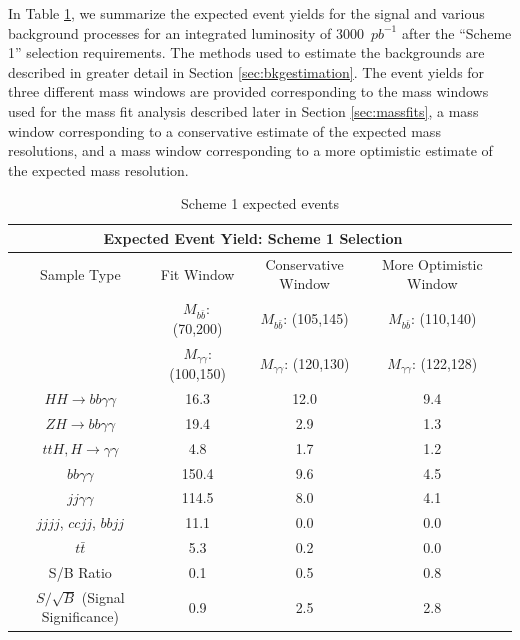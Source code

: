 \documentclass{cmspaper}
\begin{document}
In Table \ref{tab:scheme1_events}, we summarize the expected event yields for the signal and 
various background processes for an integrated luminosity of $3000$~$pb^{-1}$ after 
the ``Scheme 1'' selection requirements. The methods used to estimate the backgrounds
are described in greater detail in Section \ref{sec:bkgestimation}. The event yields
for three different mass windows are provided corresponding to the mass windows
used for the mass fit analysis described later in Section \ref{sec:massfits}, a mass window
corresponding to a conservative estimate of the expected mass resolutions, 
and a mass window corresponding to a more optimistic estimate of the expected mass resolution.
\begin{table}[!ht]
\begin{center}
\begin{tabular}{|c|c|c|c|c|}
\hline
\multicolumn{4}{|c|}{\textbf{Expected Event Yield: Scheme 1 Selection}}                                 \\ \hline
Sample Type & Fit Window                    & Conservative Window           & More Optimistic Window    \\ 
            & $M_{b\bar{b}}:$ (70,200)      & $M_{b\bar{b}}$: (105,145)     & $M_{b\bar{b}}$: (110,140)      \\ 
            & $M_{\gamma\gamma}$: (100,150) & $M_{\gamma\gamma}$: (120,130) & $M_{\gamma\gamma}$: (122,128)  \\ 
\hline
$HH\rightarrow bb\gamma\gamma$     & 16.3     & 12.0     & 9.4       \\ \hline
$ZH\rightarrow bb \gamma\gamma$    & 19.4     & 2.9      & 1.3       \\ 
$ttH,H\rightarrow\gamma\gamma$     & 4.8      & 1.7      & 1.2       \\ 
$bb\gamma\gamma$                   & 150.4    & 9.6      & 4.5       \\ 
$jj\gamma\gamma$                   & 114.5    & 8.0      & 4.1       \\ 
$jjjj$, $ccjj$, $bbjj$             & 11.1     & 0.0      & 0.0       \\ 
$t\bar{t}$                         & 5.3      & 0.2      & 0.0       \\ \hline
S/B Ratio                          & 0.1      & 0.5      & 0.8       \\ \hline
$S/\sqrt{B}$ (Signal Significance) & 0.9      & 2.5      & 2.8       \\ \hline
\end{tabular}
\caption{Scheme 1 expected events}
\label{tab:scheme1_events}
\end{center}
\end{table}
\end{document}
